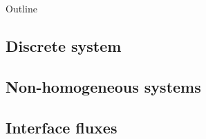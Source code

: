 \begin{frame}[plain]{Outline}
\end{frame}

\subsection{Discrete system}
\subsection{Non-homogeneous systems}
\subsection{Interface fluxes}
